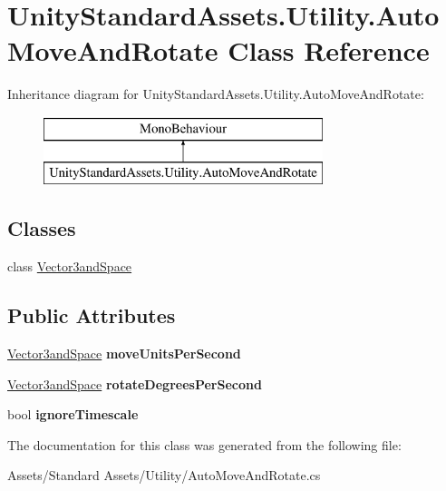 \hypertarget{class_unity_standard_assets_1_1_utility_1_1_auto_move_and_rotate}{}\section{Unity\+Standard\+Assets.\+Utility.\+Auto\+Move\+And\+Rotate Class Reference}
\label{class_unity_standard_assets_1_1_utility_1_1_auto_move_and_rotate}
Inheritance diagram for Unity\+Standard\+Assets.\+Utility.\+Auto\+Move\+And\+Rotate\+:\begin{figure}[H]
\begin{center}
\leavevmode
\includegraphics[height=2.000000cm]{class_unity_standard_assets_1_1_utility_1_1_auto_move_and_rotate}
\end{center}
\end{figure}
\subsection*{Classes}
\begin{DoxyCompactItemize}
\item 
class \hyperlink{class_unity_standard_assets_1_1_utility_1_1_auto_move_and_rotate_1_1_vector3and_space}{Vector3and\+Space}
\end{DoxyCompactItemize}
\subsection*{Public Attributes}
\begin{DoxyCompactItemize}
\item 
\hyperlink{class_unity_standard_assets_1_1_utility_1_1_auto_move_and_rotate_1_1_vector3and_space}{Vector3and\+Space} {\bfseries move\+Units\+Per\+Second}\hypertarget{class_unity_standard_assets_1_1_utility_1_1_auto_move_and_rotate_ac1c663ec1f1d0f5f3659506a9738bd32}{}\label{class_unity_standard_assets_1_1_utility_1_1_auto_move_and_rotate_ac1c663ec1f1d0f5f3659506a9738bd32}

\item 
\hyperlink{class_unity_standard_assets_1_1_utility_1_1_auto_move_and_rotate_1_1_vector3and_space}{Vector3and\+Space} {\bfseries rotate\+Degrees\+Per\+Second}\hypertarget{class_unity_standard_assets_1_1_utility_1_1_auto_move_and_rotate_a44e784fd8e9253c3ae420024be95b0e2}{}\label{class_unity_standard_assets_1_1_utility_1_1_auto_move_and_rotate_a44e784fd8e9253c3ae420024be95b0e2}

\item 
bool {\bfseries ignore\+Timescale}\hypertarget{class_unity_standard_assets_1_1_utility_1_1_auto_move_and_rotate_a976e08503afdbe2ecc8167b224bc63de}{}\label{class_unity_standard_assets_1_1_utility_1_1_auto_move_and_rotate_a976e08503afdbe2ecc8167b224bc63de}

\end{DoxyCompactItemize}


The documentation for this class was generated from the following file\+:\begin{DoxyCompactItemize}
\item 
Assets/\+Standard Assets/\+Utility/Auto\+Move\+And\+Rotate.\+cs\end{DoxyCompactItemize}
